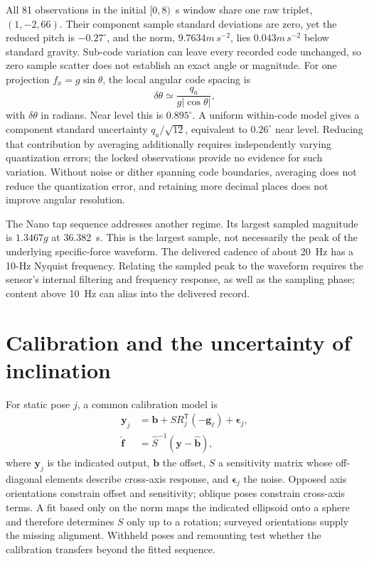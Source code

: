 All 81 observations in the initial $[0,8)$~s window share one raw triplet, $(1,-2,66)$. Their component sample standard deviations are zero, yet the reduced pitch is $-0.27^\circ$, and the norm, $9.7634\unit{m\,s^{-2}}$, lies $0.043\unit{m\,s^{-2}}$ below standard gravity. Sub-code variation can leave every recorded code unchanged, so zero sample scatter does not establish an exact angle or magnitude. For one projection $f_x=g\sin\theta$, the local angular code spacing is
\begin{equation}
 \delta\theta\simeq\frac{q_a}{g|\cos\theta|},
 \label{eq:accel-angular-resolution}
\end{equation}
with $\delta\theta$ in radians. Near level this is $0.895^\circ$. A uniform within-code model gives a component standard uncertainty $q_a/\sqrt{12}$, equivalent to $0.26^\circ$ near level. Reducing that contribution by averaging additionally requires independently varying quantization errors; the locked observations provide no evidence for such variation. Without noise or dither spanning code boundaries, averaging does not reduce the quantization error, and retaining more decimal places does not improve angular resolution.

The Nano tap sequence addresses another regime. Its largest sampled magnitude is $1.3467g$ at 36.382~s. This is the largest sample, not necessarily the peak of the underlying specific-force waveform. The delivered cadence of about 20~Hz has a 10-Hz Nyquist frequency. Relating the sampled peak to the waveform requires the sensor's internal filtering and frequency response, as well as the sampling phase; content above 10~Hz can alias into the delivered record.

\section{Calibration and the uncertainty of inclination}
For static pose $j$, a common calibration model is
\begin{equation}
 \begin{aligned}
 \bm y_j&=\bm b+S R_j^\mathsf T(-\bm g_\ell)+\bm\epsilon_j,\\
 \widehat{\bm f}&=\widehat S^{-1}(\bm y-\widehat{\bm b}),
 \end{aligned}
 \label{eq:accel-calibration}
\end{equation}
where $\bm y_j$ is the indicated output, $\bm b$ the offset, $S$ a sensitivity matrix whose off-diagonal elements describe cross-axis response, and $\bm\epsilon_j$ the noise. Opposed axis orientations constrain offset and sensitivity; oblique poses constrain cross-axis terms. A fit based only on the norm maps the indicated ellipsoid onto a sphere and therefore determines $S$ only up to a rotation; surveyed orientations supply the missing alignment. Withheld poses and remounting test whether the calibration transfers beyond the fitted sequence.

